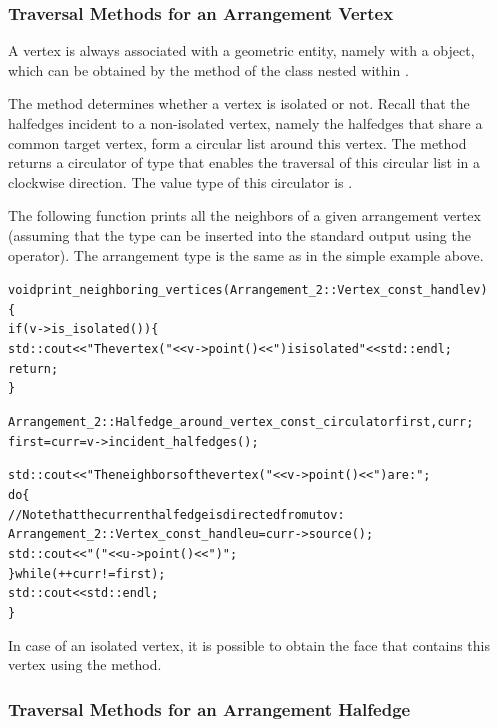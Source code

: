 \subsubsection{Traversal Methods for an Arrangement Vertex}
\label{arr_sssec:tr_vertex}

A vertex is always associated with a geometric entity, namely with
a  object, which can be obtained by the 
method of the  class nested within .

The  method determines whether a vertex is isolated
or not. Recall that the halfedges incident to a non-isolated vertex,
namely the halfedges that share a common target vertex, form a circular
list around this vertex. The  method returns
a circulator of type 
that enables the traversal of this circular list in a clockwise
direction. The value type of this circulator is .

The following function prints all the neighbors of a given
arrangement vertex (assuming that the  type can be
inserted into the standard output using the \ccc{<<} operator). The
arrangement type is the same as in the simple example above.
\begin{alltt}
void print_neighboring_vertices (Arrangement_2::Vertex_const_handle v)
\{
  if (v->is_isolated()) \{
    std::cout << "The vertex (" << v->point() << ") is isolated" << std::endl;
    return;
  \}

  Arrangement_2::Halfedge_around_vertex_const_circulator first, curr;
  first = curr = v->incident_halfedges();

  std::cout << "The neighbors of the vertex (" << v->point() << ") are:";
  do \{
    // Note that the current halfedge is directed from u to v:
    Arrangement_2::Vertex_const_handle u = curr->source();
    std::cout << " (" << u->point() << ")";
  \} while (++curr != first);
  std::cout << std::endl;
\}
\end{alltt}

In case of an isolated vertex, it is possible to obtain the face
that contains this vertex using the  method.

\subsubsection{Traversal Methods for an Arrangement Halfedge}
\label{arr_sssec:tr_halfedge}

